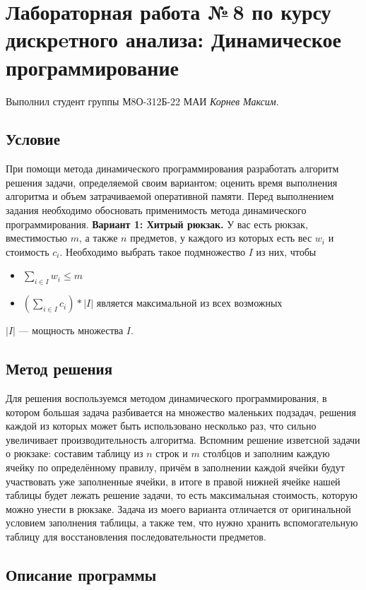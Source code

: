 \documentclass[12pt]{article}
\begin{document}
\section*{Лабораторная работа №\,8 по курсу дискрeтного анализа: 
Динамическое программирование}

Выполнил студент группы М8О-312Б-22 МАИ \textit{Корнев Максим}.

\subsection*{Условие}
При помощи метода динамического программирования разработать алгоритм 
решения задачи, определяемой своим вариантом; оценить время выполнения 
алгоритма и объем затрачиваемой оперативной памяти. Перед выполнением 
задания необходимо обосновать применимость метода динамического 
программирования.
\textbf{Вариант 1: Хитрый рюкзак.} У вас есть рюкзак, вместимостью 
$m$, а также $n$ предметов, у каждого из которых есть вес $w_i$ и 
стоимость $c_i$. Необходимо выбрать такое подмножество $I$ из них, чтобы
\begin{itemize}
\item $\sum\limits_{i \in I} w_i \leq m$
\item $(\sum\limits_{i \in I} c_i) \ast |I|$ является максимальной из всех 
возможных
\end{itemize}
$|I|$ — мощность множества $I$.


\newpage
\subsection*{Метод решения}

 Для решения воспользуемся методом динамического программирования, в котором 
большая задача разбивается на множество маленьких подзадач, решения каждой 
из которых может быть использовано несколько раз, что сильно увеличивает 
производительность алгоритма. Вспомним решение изветсной задачи о рюкзаке: 
составим таблицу из $n$ строк и $m$ столбцов и заполним каждую ячейку по 
определённому правилу, причём в заполнении каждой ячейки будут участвовать 
уже заполненные ячейки, в итоге в правой нижней ячейке нашей таблицы будет 
лежать решение задачи, то есть максимальная стоимость, которую можно унести 
в рюкзаке. Задача из моего варианта отличается от оригинальной условием 
заполнения таблицы, а также тем, что нужно хранить вспомогательную таблицу 
для восстановления последовательности предметов.

\subsection*{Описание программы}
\end{document}
